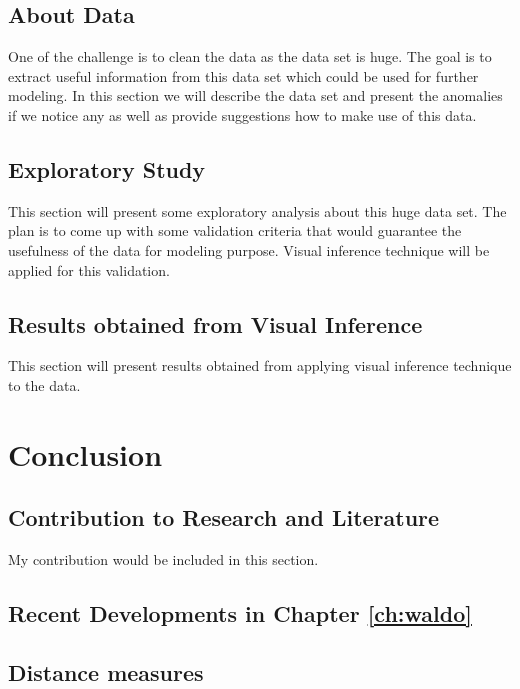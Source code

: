 \documentclass[12]{report}
\begin{document}
\section{About Data} One of the challenge is to clean the data as the data set is huge. The goal is to extract useful information from this data set which could be used for further modeling. In this section we will describe the data set and present the anomalies if we notice any as well as provide suggestions how to make use of this data.

\section{Exploratory Study} This section will present some exploratory analysis about this huge data set. The plan is to come up with some validation criteria that would guarantee the usefulness of the data for modeling purpose. Visual inference technique will be applied for this validation.

\section{Results obtained from Visual Inference} This section will present results obtained from applying visual inference technique to the data.%

\chapter{Conclusion}\label{ch:conclusion}

\section{Contribution to Research and Literature} My contribution would be included in this section.

\section{Recent Developments in Chapter \ref{ch:waldo}}

\section{Distance measures}
\end{document}
